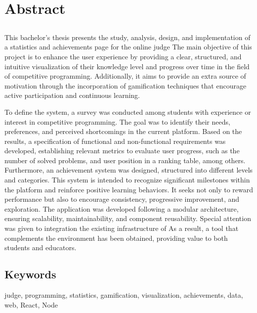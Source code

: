 \chapter*{Abstract}

\section*{\tituloPortadaEngVal}
This bachelor's thesis presents the study, analysis, design, and implementation of a statistics and achievements page for the online judge \aer The main objective of this project is to enhance the user experience by providing a clear, structured, and intuitive visualization of their knowledge level and progress over time in the field of competitive programming. Additionally, it aims to provide an extra source of motivation through the incorporation of gamification techniques that encourage active participation and continuous learning. 

To define the system, a survey was conducted among students with experience or interest in competitive programming. The goal was to identify their needs, preferences, and perceived shortcomings in the current platform. Based on the results, a specification of functional and non-functional requirements was developed, establishing relevant metrics to evaluate user progress, such as the number of solved problems, and user position in a ranking table, among others.
Furthermore, an achievement system was designed, structured into different levels and categories. This system is intended to recognize significant milestones within the platform and reinforce positive learning behaviors. It seeks not only to reward performance but also to encourage consistency, progressive improvement, and exploration.
The application was developed following a modular architecture, ensuring scalability, maintainability, and component reusability. Special attention was given to integration the existing infrastructure of \aer
As a result, a tool that complements the \aer environment has been obtained, providing value to both students and educators.


\section*{Keywords}
\vspace{-0.5em}
\noindent judge, programming, statistics, gamification, visualization, achievements, data, web, React, Node